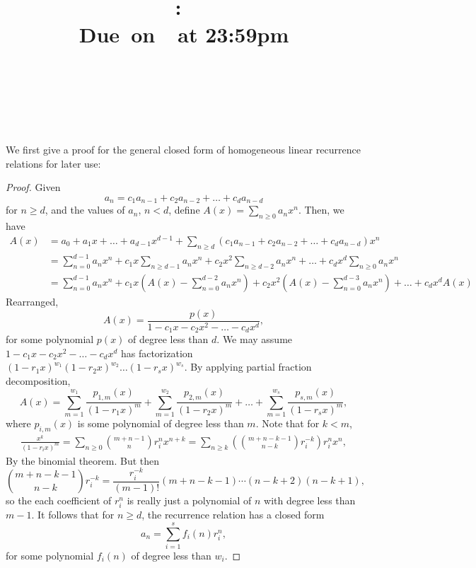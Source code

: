 \documentclass{article}
\title{
    \vspace{2in}
    \textmd{\textbf{\hmwkClass:\ \hmwkTitle}}\\
    \normalsize\vspace{0.1in}\small{Due\ on\ \hmwkDueDate\ at 23:59pm}\\
    \vspace{0.1in}\large{\textit{\hmwkClassInstructor}} \\
    \vspace{3in}
}
\author{
  \hmwkAuthorName \\
  \vspace{0.1in}\small\hmwkPID
}
\date{}
\begin{document}
\maketitle

\pagebreak

We first give a proof for the general closed form of homogeneous linear recurrence relations for
later use: 
\begin{proof}
  Given 
  \[
    a_n = c_1a_{n - 1} + c_2a_{n - 2} + \dots + c_da_{n - d}
  \]
  for $n \geq d$, and the values of $a_n$, $n < d$, define $A(x) = \sum\limits_{n \geq 0} a_nx^n$.
  Then, we have 
  \begin{align*}
    A(x) 
    &= a_0 + a_1x + \dots + a_{d - 1}x^{d - 1} + \sum_{n \geq d} (c_1a_{n - 1} + c_2a_{n - 2} + \dots + c_da_{n - d})x^n \\
    &= \sum_{n = 0}^{d - 1} a_nx^n + c_1x\sum_{n \geq d - 1} a_{n}x^n + c_2x^2\sum_{n \geq d - 2} a_{n}x^n + \dots + c_dx^d\sum_{n \geq 0} a_{n}x^n \\
    &= \sum_{n = 0}^{d - 1} a_nx^n + c_1x\left(A(x) - \sum_{n = 0}^{d - 2} a_nx^n\right) + c_2x^2\left(A(x) - \sum_{n = 0}^{d - 3} a_nx^n\right) + \dots + c_dx^dA(x)
  \end{align*}
  Rearranged,
  \[
    A(x) = \frac{p(x)}{1 - c_1x - c_2x^2 - \dots - c_dx^d},
    \]
  for some polynomial $p(x)$ of degree less than $d$. We may assume $1 - c_1x - c_2x^2 - \dots -
  c_dx^d$ has factorization $(1 - r_1x)^{w_1}(1 - r_2x)^{w_2} \dots (1 - r_sx)^{w_s}$. By applying
  partial fraction decomposition,
  \[
    A(x) = \sum_{m = 1}^{w_1} \frac{p_{1, m}(x)}{(1 - r_1x)^m} + \sum_{m = 1}^{w_2} \frac{p_{2, m}(x)}{(1 - r_2x)^m} + \dots + \sum_{m = 1}^{w_s} \frac{p_{s, m}(x)}{(1 - r_sx)^m},
  \]
  where $p_{i, m}(x)$ is some polynomial of degree less than $m$. Note that for $k < m$,
  \begin{gather*}
    \frac{x^k}{(1 - r_ix)^m} = \sum_{n \geq 0} {m + n - 1 \choose n}r_i^nx^{n + k} = \sum_{n \geq k} \left({m + n - k - 1 \choose n - k}r_i^{-k}\right)r_i^{n}x^{n},
  \end{gather*}
  By the binomial theorem. But then
  \[
    {m + n - k - 1 \choose n - k}r_i^{-k} = \frac{r_i^{-k}}{(m - 1)!}(m + n - k - 1) \cdots (n - k + 2)(n - k + 1),
  \]
  so the each coefficient of $r_i^n$ is really just a polynomial of $n$ with degree less than $m -
  1$. It follows that for $n \geq d$, the recurrence relation has a closed form 
  \[
    a_n = \sum_{i = 1}^s f_i(n)r_i^n,
  \]
  for some polynomial $f_i(n)$ of degree less than $w_i$.
\end{proof}
\end{document}

